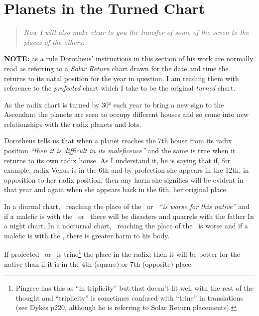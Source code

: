 \section{Planets in the Turned Chart}
\begin{quote}
\textsl{Now I will also make clear to you the transfer of some of the seven to the places of the others.}
\end{quote}

\begin{mdframed}[backgroundcolor=cyan!5, rightmargin=1em, leftmargin=1em]
\textbf{NOTE:} as a rule Dorotheus' instructions in this section of his work are normally read as referring to a \textsl{Solar Return} chart drawn for the date and time the \Sun\, returns to its natal position for the year in question. I am reading them with reference to the \textsl{profected} chart which I take to be the original \textsl{turned} chart.

As the radix chart is turned by 30° each year to bring a new sign to the Ascendant the planets are seen to occupy different houses and so come into new relationships with the radix planets and lots.
\end{mdframed}

Dorotheus  tells us that when a planet reaches the 7th house from its radix position \textsl{``then it is difficult in its maleficence''} and the same is true when it returns to its own radix house. As I understand it, he is saying that if, for example, radix Venus is in the 6th and by profection she appears in the 12th, in opposition to her radix position, then any harm she signifies will be evident in that year and again when she appears back in the 6th, her original place.

In  a diurnal chart, \Mars\, reaching the place of the \Sun\, or \Jupiter\, \textsl{``is worse for this native''} and if a malefic is with the \Sun\, or \Jupiter\, there will be disasters and quarrels with the father In a night chart. In a nocturnal chart, \Saturn\, reaching the place of the \Moon\, is worse and if a malefic is with the \Moon, there is greater harm to his body.

If  profected \Saturn\, or \Mars\, is trine\footnote{Pingree has this as ``in triplicity'' but that doesn't fit well with the rest of the thought and ``triplicity'' is sometimes confused with ``trine'' in translations (see Dykes p220, although he is referring to Solar Return placements).} the place in the radix, then it will be better for the native than if it is in the 4th (square) or 7th (opposite) place.

